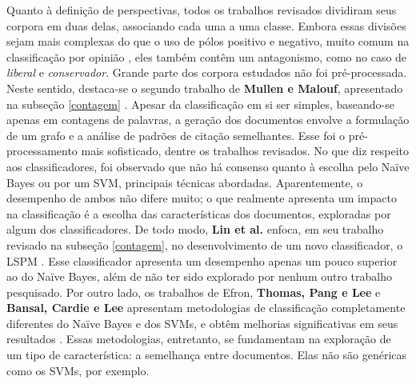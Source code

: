 Quanto à definição de perspectivas, todos os trabalhos revisados dividiram seus corpora em duas delas, associando cada uma a uma classe. Embora essas divisões sejam mais complexas do que o uso de pólos positivo e negativo, muito comum na classificação por opinião \cite{thumbs-up} \cite{peanut-gallery}, eles também contêm um  antagonismo, como no caso de \emph{liberal} e \emph{conservador}. Grande parte dos corpora estudados não foi pré-processada. Neste sentido, destaca-se o segundo trabalho de \textbf{Mullen e Malouf}, apresentado na subseção \ref{contagem} \cite{malouf-taking_sides}. Apesar da classificação em si ser simples, baseando-se apenas em contagens de palavras, a geração dos documentos envolve a formulação de um grafo e a análise de padrões de citação semelhantes. Esse foi o pré-processamento mais sofisticado, dentre os trabalhos revisados. No que diz respeito aos classificadores, foi observado que não há consenso quanto à escolha pelo Naïve Bayes ou por um SVM, principais técnicas abordadas. Aparentemente, o desempenho de ambos não difere muito; o que realmente apresenta um impacto na classificação é a escolha das características dos documentos, exploradas por algum dos classificadores. De todo modo, \textbf{Lin et al.} enfoca, em seu trabalho revisado na subseção \ref{contagem}, no desenvolvimento de um novo classificador, o LSPM \cite{lin-et-al2006}. Esse classificador apresenta um desempenho apenas um pouco superior ao do Naïve Bayes, além de não ter sido explorado por nenhum outro trabalho pesquisado. Por outro lado, os trabalhos de Efron, \textbf{Thomas, Pang e Lee} e \textbf{Bansal, Cardie e Lee} apresentam metodologias de classificação completamente diferentes do Naïve Bayes e dos SVMs, e obtêm melhorias significativas em seus resultados \cite{efron} \cite{get-out-the-vote} \cite{disagree}. Essas metodologias, entretanto, se fundamentam na exploração de um tipo de característica: a semelhança entre documentos. Elas não são genéricas como os SVMs, por exemplo. 

